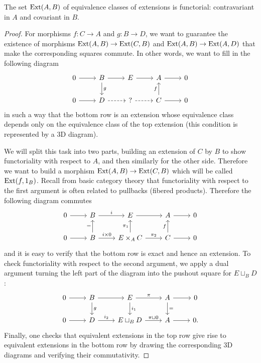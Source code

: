 \begin{thm}
    The set $\operatorname{Ext}(A,B)$ of equivalence classes of extensions is functorial: contravariant in $A$ and covariant in $B$.
\end{thm}
\begin{proof}
    For morphisms $f:C\to A$ and $g:B\to D$, we want to guarantee the existence of morphisms $\operatorname{Ext}(A,B)\to \operatorname{Ext}(C,B)$ and $\operatorname{Ext}(A,B)\to \operatorname{Ext}(A,D)$ that make the corresponding squares commute. In other words, we want to fill in the following diagram
    \[\begin{tikzcd}
        0\arrow[r] & B\arrow[r]\arrow[d,"g"] & E \arrow[r] & A\arrow[r] & 0 \\
        0\arrow[r] & D\arrow[r,dashed]       & ?  \arrow[r,dashed]    & C\arrow[r] \arrow[u,"f"] & 0
    \end{tikzcd}\]
    in such a way that the bottom row is an extension whose equivalence class depends only on the equivalence class of the top extension (this condition is represented by a 3D diagram).

    We will split this task into two parts, building an extension of $C$ by $B$ to show functoriality with respect to $A$, and then similarly for the other side. Therefore we want to build  a morphism $\operatorname{Ext}(A,B)\to \operatorname{Ext}(C,B)$ which will be called $\operatorname{Ext}(f,1_B)$. Recall from basic category theory that functoriality with respect to the first argument is often related to pullbacks (fibered products). Therefore the following diagram commutes
    \[\begin{tikzcd}
        0\arrow[r] & B\arrow[r,"i"] & E \arrow[r] & A\arrow[r] & 0 \\
        0\arrow[r] & B\arrow[r,"i\times 0"]\arrow[u,"="]       & E\times_A C  \arrow[r,"\pi_2"]\arrow[u,"\pi_1"]    & C\arrow[r] \arrow[u,"f"] & 0
    \end{tikzcd}\]
    and it is easy to verify that the bottom row is exact and hence an extension. To check functoriality with respect to the second argument, we apply a dual argument turning the left part of the diagram into the pushout square for $E\sqcup_B D$:
    \[\begin{tikzcd}
        0\arrow[r] & B\arrow[r]\arrow[d,"g"] & E \arrow[r,"\pi"]\arrow[d,"i_1"] & A\arrow[r]\arrow[d,"="] & 0 \\
        0\arrow[r] & D\arrow[r,"i_2"]      & E\sqcup_B D  \arrow[r,"\pi\sqcup 0"] & A\arrow[r] & 0.
    \end{tikzcd}\]
    Finally, one checks that equivalent extensions in the top row give rise to equivalent extensions in the bottom row by drawing the corresponding 3D diagrams and verifying their commutativity.
\end{proof}

